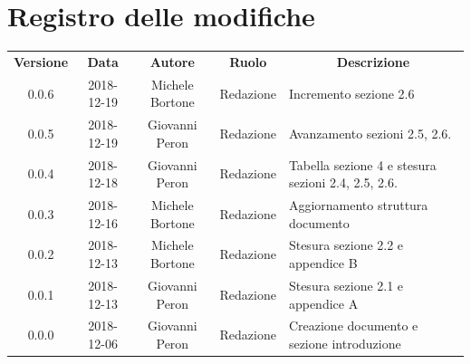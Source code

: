 \documentclass[11pt,a4paper]{article}
\begin{document}
	

	\tableofcontents
	\newpage
	\section*{\centering Registro delle modifiche}
	\begin{tabularx}{\textwidth}{ c | c | c | c | X }
		\rowcolor{LightBlue}
		\color{white}\bfseries Versione & \color{white}\bfseries Data & \color{white}\bfseries Autore & \color{white}\bfseries Ruolo & \multicolumn{1}{c}{\color{white}\bfseries Descrizione}\\[0.25cm]
		0.0.6 & 2018-12-19 & Michele Bortone & Redazione & Incremento sezione 2.6\\
		0.0.5 & 2018-12-19 & Giovanni Peron & Redazione & Avanzamento sezioni 2.5, 2.6.\\
		0.0.4 & 2018-12-18 & Giovanni Peron & Redazione & Tabella sezione 4 e stesura sezioni 2.4, 2.5, 2.6.\\
		0.0.3 & 2018-12-16 & Michele Bortone & Redazione & Aggiornamento struttura documento\\
		0.0.2 & 2018-12-13 & Michele Bortone & Redazione & Stesura sezione 2.2  e appendice B\\
		0.0.1 & 2018-12-13 & Giovanni Peron & Redazione & Stesura sezione 2.1 e appendice A \\
		0.0.0 & 2018-12-06 & Giovanni Peron & Redazione & Creazione documento e
sezione introduzione \\


	\end{tabularx}
	\newpage
		
	\newpage
	
	\newpage
	
	\newpage
	
	\newpage
		
\end{document}
